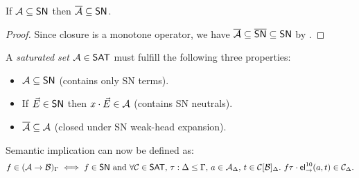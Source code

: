 


\begin{corollary}
  \label{cor:sat-preserves-sn}
  If $\mathcal{A} \subseteq \mathsf{SN}$ then $\overline{\mathcal{A}} \subseteq \mathsf{SN}$.
\end{corollary}
\begin{proof}
  Since closure is a monotone operator, we have $\overline{\mathcal{A}} \subseteq
  \overline{\mathsf{SN}} \subseteq \mathsf{SN}$ by .
\end{proof}

A \emph{saturated set} $\mathcal{A} \in \mathsf{SAT}$ must fulfill the following three
properties:
\begin{itemize}%
\setlength{\itemindent}{2.7em}

\item[\namedlabel{it:sat1}{SAT1}]
$\mathcal{A} \subseteq \mathsf{SN}$ (contains only SN terms).

\item[\namedlabel{it:sat2}{SAT2}]
If $\vec E \in \mathsf{SN}$ then $x \cdot \vec E \in \mathcal{A}$ (contains SN
neutrals).

\item[\namedlabel{it:sat3}{SAT3}]
$\overline{\mathcal{A}} \subseteq \mathcal{A}$ (closed under SN weak-head expansion).

\end{itemize}

Semantic implication can now be defined as:
\[
  f \in (\mathcal{A} \to \mathcal{B})_\Gamma
  \iff
  f \in \mathsf{SN} \mbox{ and }
  \forall \mathcal{C} \in \mathsf{SAT}, \,
  \tau : \Delta \leq \Gamma, \,
  a \in \mathcal{A}_\Delta, \,
  t \in \mathcal{C}[\mathcal{B}]_\Delta.\
  f\tau \cdot \mathsf{el}_{\to}^{10}(a,t) \in \mathcal{C}_\Delta .
\]

